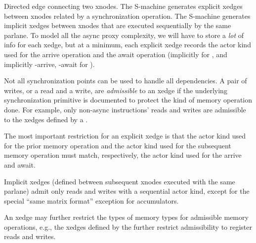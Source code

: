 \filbreak
{} Directed edge connecting two xnodes.
The S-machine generates explicit xedges between xnodes related by a synchronization operation.
The S-machine generates implicit xedges between xnodes that are executed sequentially by the same parlane.
To model all the async proxy complexity, we will have to store a \textit{lot} of info for each xedge, but at a minimum, each explicit xedge records the actor kind used for the arrive operation and the await operation (implicitly  for , and implicitly -arrive, -await for ).

\filbreak
{} Not all synchronization points can be used to handle all dependencies.
A pair of writes, or a read and a write, are \textit{admissible} to an xedge if the underlying synchronization primitive is documented to protect the kind of memory operation done. For example, only non-async instructions' reads and writes are admissible to the xedges defined by a .

\filbreak
The most important restriction for an explicit xedge is that the actor kind used for the prior memory operation and the actor kind used for the subsequent memory operation must match, respectively, the actor kind used for the arrive and await.

\filbreak
Implicit xedges (defined between subsequent xnodes executed with the same parlane) admit only reads and writes with a sequential actor kind, except for the special ``same matrix format'' exception for  accumulators.

\filbreak
An xedge may further restrict the types of memory types for admissible memory operations, e.g., the xedges defined by the  further restrict admissibility to register reads and writes.

\filbreak
{}

